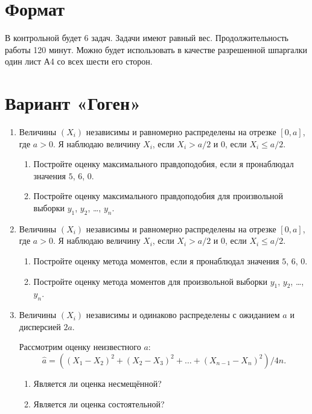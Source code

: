 \documentclass[12pt]{article}
\begin{document}
\section*{Формат}

В контрольной будет 6 задач.
Задачи имеют равный вес. 
Продолжительность работы 120 минут. 
Можно будет использовать в качестве разрешенной шпаргалки один лист А4 со всех шести его сторон.



\section*{Вариант «Гоген»}
\begin{enumerate}
    \item Величины $(X_i)$ независимы и равномерно распределены на отрезке $[0, a]$, где $a > 0$.
    Я наблюдаю величину $X_i$, если $X_i > a/2$ и $0$, если $X_i \leq a/2$.
    \begin{enumerate}
        \item Постройте оценку максимального правдоподобия, если я пронаблюдал значения $5$, $6$, $0$.
        \item Постройте оценку максимального правдоподобия для произвольной выборки $y_1$, $y_2$, \dots, $y_n$.
    \end{enumerate}
    
    \item Величины $(X_i)$ независимы и равномерно распределены на отрезке $[0, a]$, где $a > 0$.
    Я наблюдаю величину $X_i$, если $X_i > a/2$ и $0$, если $X_i \leq a/2$.
    \begin{enumerate}
        \item Постройте оценку метода моментов, если я пронаблюдал значения $5$, $6$, $0$.
        \item Постройте оценку метода моментов для произвольной выборки $y_1$, $y_2$, \dots, $y_n$.
    \end{enumerate}

    \item Величины $(X_i)$ независимы и одинаково распределены с ожиданием $a$ и дисперсией $2a$.
    
    Рассмотрим оценку неизвестного $a$:
    \[
 \hat a = ((X_1 - X_2)^2 + (X_2 - X_3)^2 + \dots + (X_{n-1} - X_{n})^2) / 4n.
    \]

    \begin{enumerate}
        \item Является ли оценка несмещённой?
        \item Является ли оценка состоятельной?
    \end{enumerate}


\end{enumerate}
\end{document}
